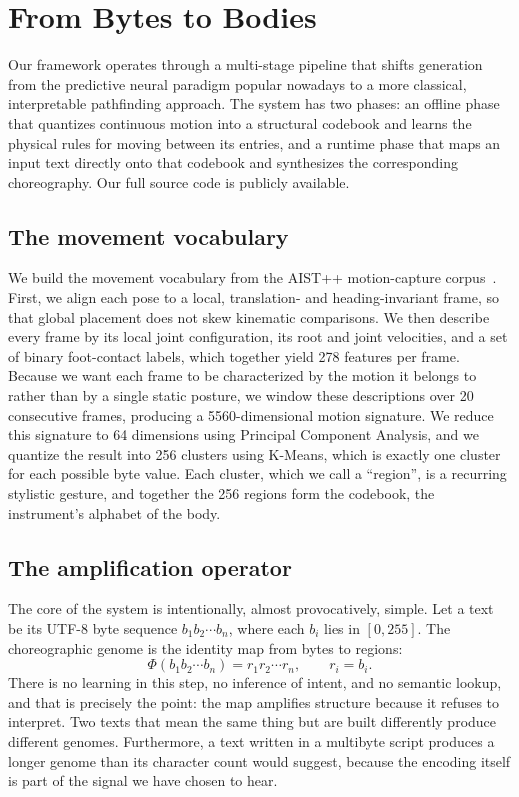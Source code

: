 \documentclass{vgtc}                          %
\begin{document}
\section{From Bytes to Bodies}
\label{sec:system}

Our framework operates through a multi-stage pipeline that shifts generation from
the predictive neural paradigm popular nowadays to a more classical, interpretable pathfinding approach. The system
has two phases: an offline phase that quantizes continuous motion into a
structural codebook and learns the physical rules for moving between its entries,
and a runtime phase that maps an input text directly onto that codebook and
synthesizes the corresponding choreography. Our full source code is publicly
available.

\subsection{The movement vocabulary}
We build the movement vocabulary from the AIST++ motion-capture
corpus~\cite{li2021aist}. First, we align each pose to a local, translation- and
heading-invariant frame, so that global placement does not skew kinematic
comparisons. We then describe every frame by its local joint configuration, its
root and joint velocities, and a set of binary foot-contact labels, which together
yield 278 features per frame. Because we want each frame to be characterized by
the motion it belongs to rather than by a single static posture, we window these
descriptions over 20 consecutive frames, producing a 5560-dimensional motion
signature. We reduce this signature to 64 dimensions using Principal Component
Analysis, and we quantize the result into 256 clusters using K-Means, which is
exactly one cluster for each possible byte value. Each cluster, which we call a
``region'', is a recurring stylistic gesture, and together the 256 regions form
the codebook, the instrument's alphabet of the body.

\subsection{The amplification operator}
The core of the system is intentionally, almost provocatively, simple. Let a text
be its UTF-8 byte sequence $b_1 b_2 \cdots b_n$, where each $b_i$ lies in
$[0, 255]$. The choreographic genome is the identity map from bytes to regions:
\begin{equation}
\Phi(b_1 b_2 \cdots b_n) = r_1 r_2 \cdots r_n, \qquad r_i = b_i .
\label{eq:amp}
\end{equation}
There is no learning in this step, no inference of intent, and no semantic lookup,
and that is precisely the point: the map amplifies structure because it refuses to
interpret. Two texts that mean the same thing but are built differently produce
different genomes. Furthermore, a text written in a multibyte script produces a
longer genome than its character count would suggest, because the encoding itself
is part of the signal we have chosen to hear.
\end{document}

